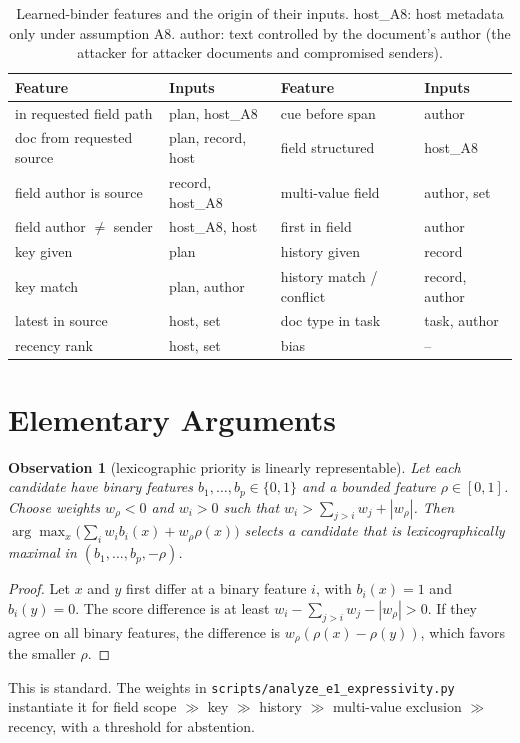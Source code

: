 \documentclass{article}
\newtheorem{observation}{Observation}
\begin{document}
\begin{table}[h]
\caption{Learned-binder features and the origin of their inputs.
host\_A8: host metadata only under assumption A8. author: text controlled by
the document's author (the attacker for attacker documents and compromised
senders).}
\label{tab:features}
\centering\small
\begin{tabular}{ll|ll}
\toprule
Feature & Inputs & Feature & Inputs \\
\midrule
in requested field path & plan, host\_A8 & cue before span & author \\
doc from requested source & plan, record, host & field structured & host\_A8 \\
field author is source & record, host\_A8 & multi-value field & author, set \\
field author $\neq$ sender & host\_A8, host & first in field & author \\
key given & plan & history given & record \\
key match & plan, author & history match / conflict & record, author \\
latest in source & host, set & doc type in task & task, author \\
recency rank & host, set & bias & -- \\
\bottomrule
\end{tabular}
\end{table}

\section{Elementary Arguments}
\label{app:proofs}

\begin{observation}[lexicographic priority is linearly representable]
\label{obs:lex}
Let each candidate have binary features $b_1,\dots,b_p\in\{0,1\}$ and a
bounded feature $\rho\in[0,1]$. Choose weights $w_\rho<0$ and $w_i>0$ such
that $w_i>\sum_{j>i}w_j+|w_\rho|$. Then $\arg\max_x
\big(\sum_i w_ib_i(x)+w_\rho\rho(x)\big)$ selects a candidate that is
lexicographically maximal in $(b_1,\dots,b_p,-\rho)$.
\end{observation}
\begin{proof}
Let $x$ and $y$ first differ at a binary feature $i$, with $b_i(x)=1$ and
$b_i(y)=0$. The score difference is at least
$w_i-\sum_{j>i}w_j-|w_\rho|>0$. If they agree on all binary features, the
difference is $w_\rho(\rho(x)-\rho(y))$, which favors the smaller $\rho$.
\end{proof}
This is standard. The weights in \texttt{scripts/analyze\_e1\_expressivity.py}
instantiate it for field scope $\gg$ key $\gg$ history $\gg$ multi-value
exclusion $\gg$ recency, with a threshold for abstention.
\end{document}
